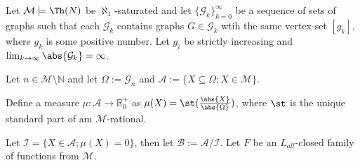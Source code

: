 \begin{defi}
Let $\mathcal{M}\models \Th(N)$ be $\aleph_1$-saturated and let $\{\mathcal{G}_k\}_{k=0}^\infty$ be a sequence of sets of graphs such that each $\mathcal{G}_k$ contains graphs $G\in\mathcal{G}_k$ wtih the same vertex-set $[g_k]$, where $g_k$ is some positive number. Let $g_i$ be strictly increasing and $\lim_{k\to\infty}\abs{\mathcal{G}_k}=\infty$.

Let $n\in\mathcal{M}\setminus\mathbb{N}$ and let $\Omega:=\mathcal{G}_n$ and $\mathcal{A}:=\{X\subseteq \Omega;X\in\mathcal{M}\}$.

Define a measure $\mu:\mathcal{A}\to\mathbb{R}^+_0$ as $\mu(X)=\st(\frac{\abs{X}}{\abs{\Omega}})$, where $\st$ is the unique standard part of am $\mathcal{M}$-rational. 

Let $\mathcal{I}=\{X\in\mathcal{A};\mu(X)=0\}$, then let $\mathcal{B}:=\mathcal{A}/\mathcal{I}$. Let $F$ be an $L_{all}$-closed family of functions from $\mathcal{M}$.

\[\]
\end{defi}
